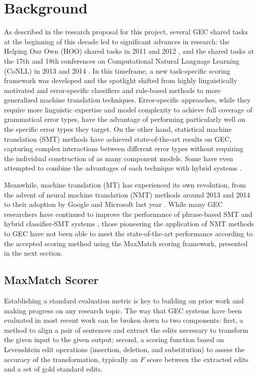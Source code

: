 \chapter{Background} \label{ch:background}
As described in the research proposal for this project, several GEC shared tasks at the beginning of this decade led to significant advances in research: the Helping Our Own (HOO) shared tasks in 2011 and 2012 \citep{Dale2011HelpingTask, Dale2012HOOTask}, and the shared tasks at the 17th and 18th conferences on Computational Natural Language Learning (CoNLL) in 2013 and 2014 \citep{Ng2013TheCorrection, Ng2014TheCorrection}. In this timeframe, a new task-specific scoring framework was developed \citep{Dahlmeier2012BetterCorrection} and the spotlight shifted from highly linguistically motivated and error-specific classifiers and rule-based methods to more generalized machine translation techniques. Error-specific approaches, while they require more linguistic expertise and model complexity to achieve full coverage of grammatical error types, have the advantage of performing particularly well on the specific error types they target. On the other hand, statistical machine translation (SMT) methods have achieved state-of-the-art results on GEC, capturing complex interactions between different error types without requiring the individual construction of as many component models. Some have even attempted to combine the advantages of each technique with hybrid systems \citep{Susanto2014SystemCorrection,Rozovskaya2016GrammaticalClassifiers}.

Meanwhile, machine translation (MT) has experienced its own revolution, from the advent of neural machine translation (NMT) methods around 2013 and 2014 \citep{Kalchbrenner2013RecurrentModels,Cho2014LearningTranslation,Cho2014OnApproaches,Sutskever2014SequenceNetworks} to their adoption by Google and Microsoft last year \citep{Wu2016GooglesTranslation}. While many GEC researchers have continued to improve the performance of phrase-based SMT \citep{Junczys-Dowmunt2016Phrase-basedCorrection,Chollampatt2016NeuralCorrection} and hybrid classifier-SMT systems \citep{Susanto2014SystemCorrection,Rozovskaya2016GrammaticalClassifiers}, those pioneering the application of NMT methods to GEC \citep{Xie2016NeuralAttention,Yuan2016GrammaticalTranslation} have not been able to meet the state-of-the-art performance according to the accepted scoring method using the MaxMatch scoring framework, presented in the next section.

\section{MaxMatch Scorer}
Establishing a standard evaluation metric is key to building on prior work and making progress on any research topic. The way that GEC systems have been evaluated in most recent work can be broken down to two components: first, a method to align a pair of sentences and extract the edits necessary to transform the given input to the given output; second, a scoring function based on Levenshtein edit operations (insertion, deletion, and substitution) to assess the accuracy of the transformation, typically an $F$ score between the extracted edits and a set of gold standard edits.

